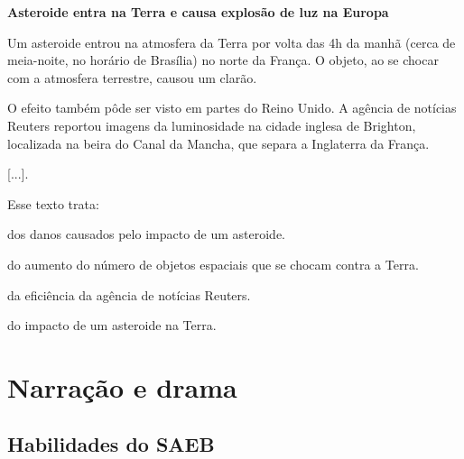 \begin{myquote}
\textbf{Asteroide entra na Terra e causa explosão de luz na Europa}

Um asteroide entrou na atmosfera da Terra por volta das 4h da manhã
(cerca de meia-noite, no horário de Brasília) no norte da França. O
objeto, ao se chocar com a atmosfera terrestre, causou um clarão.

O efeito também pôde ser visto em partes do Reino Unido. A agência de
notícias Reuters reportou imagens da luminosidade na cidade inglesa de
Brighton, localizada na beira do Canal da Mancha, que separa a
Inglaterra da França.

{[}...{]}.

\end{myquote}

Esse texto trata:

\begin{escolha}
\item dos danos causados pelo impacto de um asteroide.

\item do aumento do número de objetos espaciais que se chocam contra a Terra.

\item da eficiência da agência de notícias Reuters.

\item do impacto de um asteroide na Terra.
\end{escolha}



\chapter{Narração e drama}

\vspace*{-1\baselineskip}


\section*{Habilidades do SAEB}

